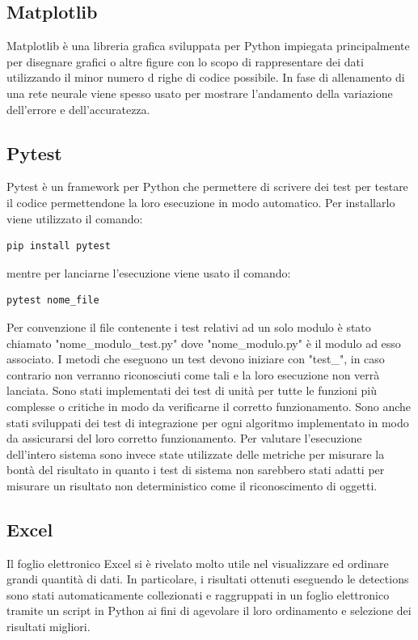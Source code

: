 \subsection{Matplotlib}
Matplotlib è una libreria grafica sviluppata per Python impiegata principalmente per disegnare grafici o altre figure con lo scopo di rappresentare dei dati utilizzando il minor numero d righe di codice possibile. In fase di allenamento di una rete neurale viene spesso usato per mostrare l'andamento della variazione dell'errore e dell'accuratezza.
\subsection{Pytest}
Pytest è un framework per Python che permettere di scrivere dei test per testare il codice permettendone la loro esecuzione in modo automatico. Per installarlo viene utilizzato il comando:
\begin{verbatim}
pip install pytest
\end{verbatim}
mentre per lanciarne l'esecuzione viene usato il comando:
\begin{verbatim}
pytest nome_file
\end{verbatim}
Per convenzione il file contenente i test relativi ad un solo modulo è stato chiamato "nome\_modulo\_test.py" dove "nome\_modulo.py" è il modulo ad esso associato. I metodi che eseguono un test devono iniziare con "test\_", in caso contrario non verranno riconosciuti come tali e la loro esecuzione non verrà lanciata. Sono stati implementati dei test di unità per tutte le funzioni più complesse o critiche in modo da verificarne il corretto funzionamento. Sono anche stati sviluppati dei test di integrazione per ogni algoritmo implementato in modo da assicurarsi del loro corretto funzionamento. Per valutare l'esecuzione dell'intero sistema sono invece state utilizzate delle metriche per misurare la bontà del risultato in quanto i test di sistema non sarebbero stati adatti per misurare un risultato non deterministico come il riconoscimento di oggetti.
\subsection{Excel}
Il foglio elettronico Excel si è rivelato molto utile nel visualizzare ed ordinare grandi quantità di dati. In particolare, i risultati ottenuti eseguendo le detections sono stati automaticamente collezionati e raggruppati in un foglio elettronico tramite un script in Python ai fini di agevolare il loro ordinamento e selezione dei risultati migliori.
